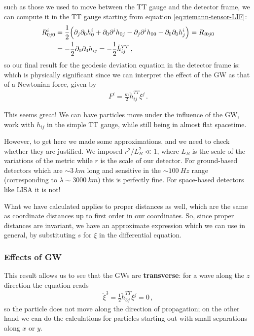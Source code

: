 \documentclass[main.tex]{subfiles}
\begin{document}
such as those we used to move between the TT gauge and the detector frame, 
we can compute it in the TT gauge starting from equation \eqref{eq:riemann-tensor-LIF}: 
%
\begin{align}
R^{i}_{0j0} &= \frac{1}{2} \qty(
  \partial_{j} \partial_0 h^{i}_{0}
  + \partial_0 \partial^{i} h_{0j} 
  - \partial_{j} \partial^{i} h_{00} 
  - \partial_0 \partial_0 h^i_{j}
) = R_{i0j0} \\
&= - \frac{1}{2} \partial_0 \partial_0 h_{ij} = - \frac{1}{2} \ddot{h}_{ij}^{TT}
\,,
\end{align}
%
so our final result for the geodesic deviation equation in the detector frame is:
%
%
which is physically significant since we can interpret the effect of the GW as that of a Newtonian force, given by
%
\begin{align}
F^{i} = \frac{m}{2} \ddot{h}^{TT}_{ij} \xi^{j}
\,.
\end{align}

This seems great! We can have particles move under the influence of the GW, work with \(h_{ij}\) in the simple TT gauge, while still being in almost flat spacetime.

However, to get here we made some approximations, and we need to check whether they are justified.
We imposed \(r^2 / L_B^2 \ll 1 \), where \(L_B\) is the scale of the variations of the metric while \(r\) is the scale of our detector. 
For ground-based detectors which are \(\sim \SI{3}{km}\) long and sensitive in the \(\sim \SI{100}{Hz}\) range (corresponding to \(\lambda \sim \SI{3000}{km}\)) this is perfectly fine. 
For space-based detectors like LISA it is not!

What we have calculated applies to proper distances as well, which are the same as coordinate distances up to first order in our coordinates.
So, since proper distances are invariant, we have an approximate expression which we can use in general, by substituting \(s\) for \(\xi \) in the differential equation. 

\subsubsection{Effects of GW}

This result allows us to see that the GWs are \textbf{transverse}: for a wave along the \(z\) direction the equation reads 
%
\begin{align}
\ddot{\xi}^{3} = \frac{1}{2} \ddot{h}_{3j}^{TT} \xi^{j} = 0
\,,
\end{align}
%
so the particle does not move along the direction of propagation;
on the other hand we can do the calculations for particles starting out with small separations along \(x\) or \(y\).
\end{document}
